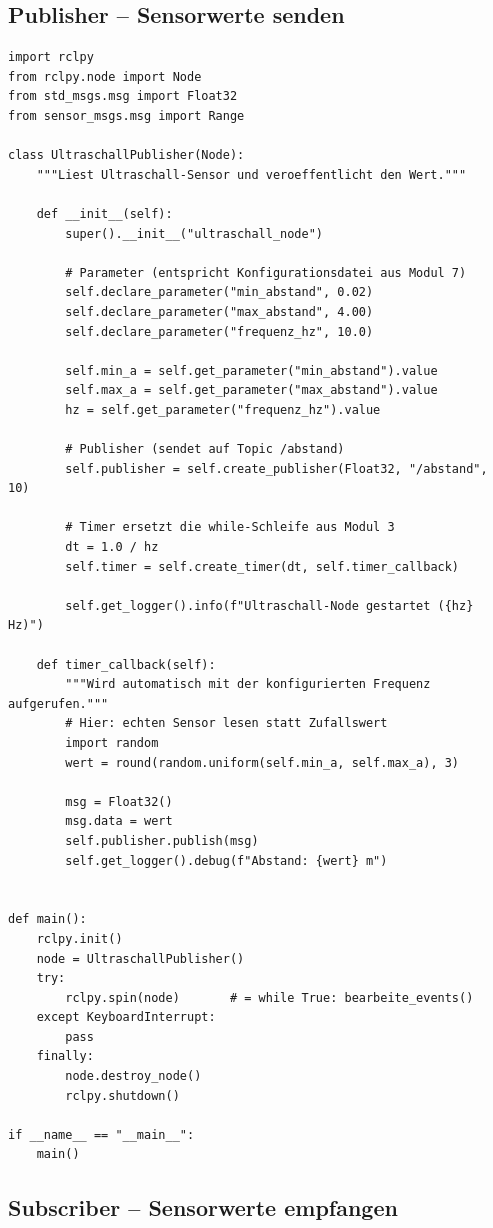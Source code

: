 \subsection*{Publisher -- Sensorwerte senden}

\begin{lstlisting}
import rclpy
from rclpy.node import Node
from std_msgs.msg import Float32
from sensor_msgs.msg import Range

class UltraschallPublisher(Node):
    """Liest Ultraschall-Sensor und veroeffentlicht den Wert."""

    def __init__(self):
        super().__init__("ultraschall_node")

        # Parameter (entspricht Konfigurationsdatei aus Modul 7)
        self.declare_parameter("min_abstand", 0.02)
        self.declare_parameter("max_abstand", 4.00)
        self.declare_parameter("frequenz_hz", 10.0)

        self.min_a = self.get_parameter("min_abstand").value
        self.max_a = self.get_parameter("max_abstand").value
        hz = self.get_parameter("frequenz_hz").value

        # Publisher (sendet auf Topic /abstand)
        self.publisher = self.create_publisher(Float32, "/abstand", 10)

        # Timer ersetzt die while-Schleife aus Modul 3
        dt = 1.0 / hz
        self.timer = self.create_timer(dt, self.timer_callback)

        self.get_logger().info(f"Ultraschall-Node gestartet ({hz} Hz)")

    def timer_callback(self):
        """Wird automatisch mit der konfigurierten Frequenz aufgerufen."""
        # Hier: echten Sensor lesen statt Zufallswert
        import random
        wert = round(random.uniform(self.min_a, self.max_a), 3)

        msg = Float32()
        msg.data = wert
        self.publisher.publish(msg)
        self.get_logger().debug(f"Abstand: {wert} m")


def main():
    rclpy.init()
    node = UltraschallPublisher()
    try:
        rclpy.spin(node)       # = while True: bearbeite_events()
    except KeyboardInterrupt:
        pass
    finally:
        node.destroy_node()
        rclpy.shutdown()

if __name__ == "__main__":
    main()
\end{lstlisting}

\subsection*{Subscriber -- Sensorwerte empfangen}


